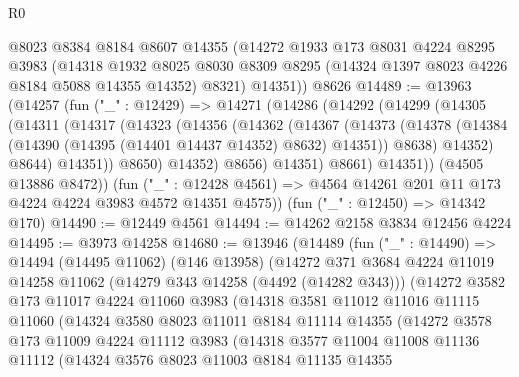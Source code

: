 \begin{lexlean}{R0}
\begin{coremodule}
      @8023
      @8384
      @8184
      @8607
      @14355
      (@14272
        @1933
        @173
        @8031
        @4224
        @8295
        @3983
        (@14318
          @1932
          @8025
          @8030
          @8309
          @8295
          (@14324 @1397 @8023 @4226 @8184 @5088 @14355 @14352)
          @8321)
        @14351))
    @8626
@14489 := @13963
    (@14257
      (fun ("_" : @12429) =>
      @14271
        (@14286
          (@14292
            (@14299
              (@14305
                (@14311
                  (@14317
                    (@14323
                      (@14356
                        (@14362
                          (@14367
                            (@14373
                              (@14378
                                (@14384 (@14390 (@14395 (@14401 @14437 @14352) @8632) @14351))
                                @8638)
                              @14352)
                            @8644)
                          @14351))
                      @8650)
                    @14352)
                  @8656)
                @14351)
              @8661)
            @14351))
        (@4505 @13886 @8472))
      (fun ("_" : @12428 @4561) => @4564 @14261 @201 @11 @173 @4224 @4224 @3983 @4572 @14351 @4575))
    (fun ("_" : @12450) => @14342 @170)
@14490 := @12449 @4561
@14494 := @14262 @2158 @3834 @12456 @4224
@14495 := @3973 @14258
@14680 := @13946
    (@14489
      (fun ("_" : @14490) =>
      @14494
        (@14495 @11062)
        (@146 @13958)
        (@14272
          @371
          @3684
          @4224
          @11019
          @14258
          @11062
          (@14279 @343 @14258 (@4492 (@14282 @343)))
          (@14272
            @3582
            @173
            @11017
            @4224
            @11060
            @3983
            (@14318
              @3581
              @11012
              @11016
              @11115
              @11060
              (@14324
                @3580
                @8023
                @11011
                @8184
                @11114
                @14355
                (@14272
                  @3578
                  @173
                  @11009
                  @4224
                  @11112
                  @3983
                  (@14318
                    @3577
                    @11004
                    @11008
                    @11136
                    @11112
                    (@14324
                      @3576
                      @8023
                      @11003
                      @8184
                      @11135
                      @14355

\end{coremodule}
\end{lexlean}

